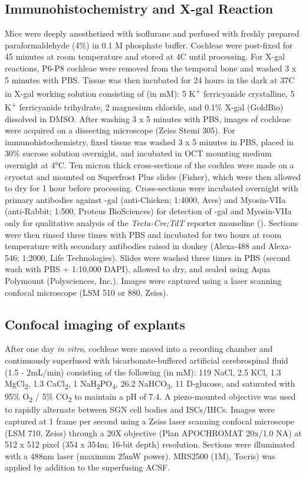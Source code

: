 \documentclass[9pt,lineno]{elife}
\begin{document}
\subsection{Immunohistochemistry and X-gal Reaction}
Mice were deeply anesthetized with isoflurane and perfused with freshly prepared paraformaldehyde (4\%) in 0.1 M phosphate buffer. Cochleae were post-fixed for 45 minutes at room temperature and stored at 4\textdegree C until processing. For X-gal reactions, P6-P8 cochleae were removed from the temporal bone and washed 3 x 5 minutes with PBS. Tissue was then incubated for 24 hours in the dark at 37\textdegree C in X-gal working solution consisting of (in mM): 5 K\textsuperscript{+} ferricyanide crystalline, 5 K\textsuperscript{+} ferricyanide trihydrate, 2 magnesium chloride, and 0.1\% X-gal (GoldBio) dissolved in DMSO. After washing 3 x 5 minutes with PBS, images of cochleae were acquired on a dissecting microscope (Zeiss Stemi 305). For immunohistochemistry, fixed tissue was washed 3 x 5 minutes in PBS, placed in 30\% sucrose solution overnight, and incubated in OCT mounting medium overnight at 4°C. Ten micron thick cross-sections of the cochlea were made on a cryostat and mounted on Superfrost Plus slides (Fisher), which were then allowed to dry for 1 hour before processing. Cross-sections were incubated overnight with primary antibodies against \textbeta-gal (anti-Chicken; 1:4000, Aves) and Myosin-VIIa (anti-Rabbit; 1:500, Proteus BioSciences) for detection of \textbeta-gal and Myosin-VIIa only for qualitative analysis of the \textit{Tecta-Cre;TdT} reporter mouseline (). Sections were then rinsed three times with PBS and incubated for two hours at room temperature with secondary antibodies raised in donkey (Alexa-488 and Alexa-546; 1:2000, Life Technologies). Slides were washed three times in PBS (second wash with PBS + 1:10,000 DAPI), allowed to dry, and sealed using Aqua Polymount (Polysciences, Inc.). Images were captured using a laser scanning confocal microscope (LSM 510 or 880, Zeiss).

\subsection{Confocal imaging of explants}
After one day \textit{in vitro}, cochleae were moved into a recording chamber and continuously superfused with bicarbonate-buffered artificial cerebrospinal fluid (1.5 - 2mL/min) consisting of the following (in mM): 119 NaCl, 2.5 KCl, 1.3 MgCl\textsubscript{2}, 1.3 CaCl\textsubscript{2}, 1 NaH\textsubscript{2}PO\textsubscript{4}, 26.2 NaHCO\textsubscript{3}, 11 D-glucose, and saturated with 95\% O\textsubscript{2} / 5\% CO\textsubscript{2} to maintain a pH of 7.4. A piezo-mounted objective was used to rapidly alternate between SGN cell bodies and ISCs/IHCs. Images were captured at 1 frame per second using a Zeiss laser scanning confocal microscope (LSM 710, Zeiss) through a 20X objective (Plan APOCHROMAT 20x/1.0 NA) at 512 x 512 pixel (354 x 354\textmu m; 16-bit depth) resolution. Sections were illuminated with a 488nm laser (maximum 25mW power). MRS2500 (1\textmu M), Tocris) was applied by addition to the superfusing ACSF.
\end{document}
